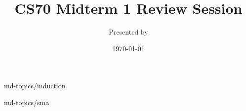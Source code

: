 

\title{CS70 Midterm 1 Review Session}
\author{Presented by }
\date{\today}

\newcommand{\SlideAccessingLogistics}{@\#}





%




 {md-topics/induction}

 {md-topics/sma}



